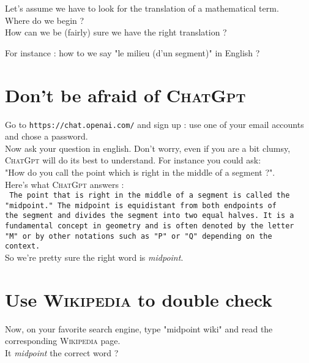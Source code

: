 \documentclass[12pt,a4paper,article,english,firamath]{nsi}
\begin{document}
\maketitle

Let's assume we have to look for the translation of a mathematical term.\\ Where do we begin ?\\ How can we be (fairly) sure we have the right translation ?

For instance : how to we say "le milieu (d'un segment)" in English ?

\section*{Don't be afraid of \textsc{ChatGpt}}

Go to \texttt{https://chat.openai.com/} and sign up : use one of your email accounts and chose a password.\\
Now ask your question in english. Don't worry, even if you are a bit clumsy, \textsc{ChatGpt} will do its best to understand. For instance you could ask:\\ "How do you call the point which is right in the middle of a segment ?".\\
Here's what \textsc{ChatGpt} answers :\\

\texttt{\noindent
    The point that is right in the middle of a segment is called the\\
    "midpoint." The midpoint is equidistant from both endpoints of \\
    the segment and divides the segment into two equal halves. It is
    a \\
    fundamental concept in geometry and is often denoted by the
    letter \\
    "M" or by other notations such as "P" or "Q" depending on
    the\\
    context.}\\

So we're pretty sure the right word is \textit{midpoint}.


\section*{Use \textsc{Wikipedia} to double check}

Now, on your favorite search engine, type "midpoint wiki" and read the corresponding \textsc{Wikipedia} page.\\
It \textit{midpoint} the correct word ?\\
\end{document}
